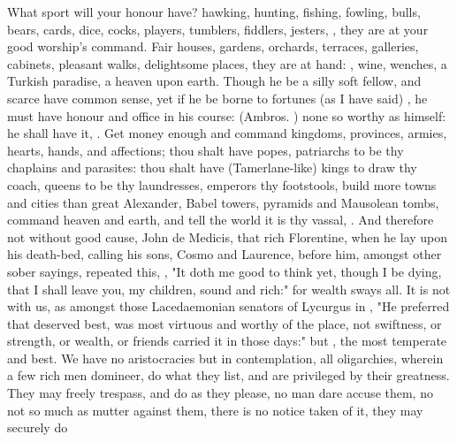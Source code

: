 What sport will your honour have? hawking, hunting, fishing, fowling, bulls,
bears, cards, dice, cocks, players, tumblers, fiddlers, jesters, \etc{}, they
are at your good worship's command. Fair houses, gardens, orchards, terraces,
galleries, cabinets, pleasant walks, delightsome places, they are at hand:
, wine, wenches, \etc{} a Turkish paradise, a heaven upon
earth. Though he be a silly soft fellow, and scarce have common sense, yet if
he be borne to fortunes (as I have said) , he must have honour and office in his course:
 (Ambros.
) none so worthy as himself: he shall have it,
. Get money enough and command
kingdoms, provinces, armies, hearts, hands, and
affections; thou shalt have popes, patriarchs to be thy chaplains and
parasites: thou shalt have (Tamerlane-like) kings to draw thy coach, queens to
be thy laundresses, emperors thy footstools, build more towns and cities than
great Alexander, Babel towers, pyramids and Mausolean tombs, \etc{} command
heaven and earth, and tell the world it is thy vassal, . And therefore not without good cause, John
de Medicis, that rich Florentine, when he lay upon his death-bed, calling his
sons, Cosmo and Laurence, before him, amongst other sober sayings, repeated
this, ,
"It doth me good to think yet, though I be dying, that I shall leave you, my
children, sound and rich:" for wealth sways all. It is not with us, as amongst
those Lacedaemonian senators of Lycurgus in \Plutarch{}, "He preferred that
deserved best, was most virtuous and worthy of the place,
not swiftness, or strength, or wealth, or friends carried
it in those days:" but , the most temperate and best. We have no aristocracies but in
contemplation, all oligarchies, wherein a few rich men domineer, do what they
list, and are privileged by their greatness. They may
freely trespass, and do as they please, no man dare accuse them, no not so much
as mutter against them, there is no notice taken of it, they may securely do
